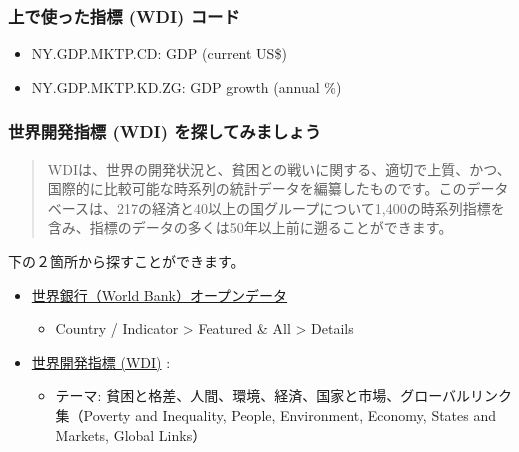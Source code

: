 \documentclass[
]{article}
\providecommand{\tightlist}{%
  \setlength{\itemsep}{0pt}\setlength{\parskip}{0pt}}
\begin{document}
\hypertarget{ux4e0aux3067ux4f7fux3063ux305fux6307ux6a19-wdi-ux30b3ux30fcux30c9}{%
\subsubsection{上で使った指標 (WDI)
コード}\label{ux4e0aux3067ux4f7fux3063ux305fux6307ux6a19-wdi-ux30b3ux30fcux30c9}}

\begin{itemize}
\tightlist
\item
  NY.GDP.MKTP.CD: GDP (current US\$)
\item
  NY.GDP.MKTP.KD.ZG: GDP growth (annual \%)
\end{itemize}

\hypertarget{ux4e16ux754cux958bux767aux6307ux6a19-wdi-ux3092ux63a2ux3057ux3066ux307fux307eux3057ux3087ux3046}{%
\subsubsection{世界開発指標 (WDI)
を探してみましょう}\label{ux4e16ux754cux958bux767aux6307ux6a19-wdi-ux3092ux63a2ux3057ux3066ux307fux307eux3057ux3087ux3046}}

\begin{quote}
WDIは、世界の開発状況と、貧困との戦いに関する、適切で上質、かつ、国際的に比較可能な時系列の統計データを編纂したものです。このデータベースは、217の経済と40以上の国グループについて1,400の時系列指標を含み、指標のデータの多くは50年以上前に遡ることができます。
\end{quote}

下の２箇所から探すことができます。

\begin{itemize}
\tightlist
\item
  \href{https://data.worldbank.org}{世界銀行（World
  Bank）オープンデータ}

  \begin{itemize}
  \tightlist
  \item
    Country / Indicator \textgreater{} Featured \& All \textgreater{}
    Details
  \end{itemize}
\item
  \href{https://datatopics.worldbank.org/world-development-indicators/}{世界開発指標
  (WDI)} :

  \begin{itemize}
  \tightlist
  \item
    テーマ:
    貧困と格差、人間、環境、経済、国家と市場、グローバルリンク集（Poverty
    and Inequality, People, Environment, Economy, States and Markets,
    Global Links）
  \end{itemize}
\end{itemize}
\end{document}
